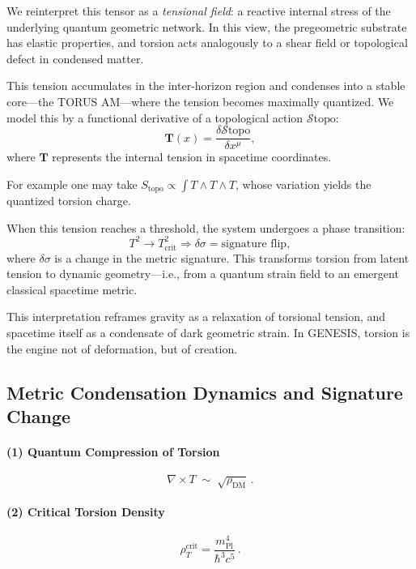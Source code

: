\documentclass{article}
\begin{document}
We reinterpret this tensor as a \textit{tensional field}: a reactive internal stress of the underlying quantum geometric network. In this view, the pregeometric substrate has elastic properties, and torsion acts analogously to a shear field or topological defect in condensed matter.

This tension accumulates in the inter-horizon region and condenses into a stable core---the TORUS AM---where the tension becomes maximally quantized. We model this by a functional derivative of a topological action $\mathcal{S}{\text{topo}}$: \begin{equation} \mathbf{T}(x) = \frac{\delta \mathcal{S}{\text{topo}}}{\delta x^\mu}, \end{equation} where $\mathbf{T}$ represents the internal tension in spacetime coordinates.

For example one may take
$S_{\text{topo}} \propto \int T \wedge T \wedge T$,
whose variation yields the quantized torsion charge.

When this tension reaches a threshold, the system undergoes a phase transition: \begin{equation} T^2 \rightarrow T_{\text{crit}}^2 \Rightarrow \delta \sigma = \text{signature flip}, \end{equation} where $\delta \sigma$ is a change in the metric signature. This transforms torsion from latent tension to dynamic geometry---i.e., from a quantum strain field to an emergent classical spacetime metric.

This interpretation reframes gravity as a relaxation of torsional tension, and spacetime itself as a condensate of dark geometric strain. In GENESIS, torsion is the engine not of deformation, but of creation.


\subsection{Metric Condensation Dynamics and Signature Change}

\paragraph{(1) Quantum Compression of Torsion}
\[
  \nabla\times T \;\sim\; \sqrt{\rho_{\mathrm{DM}}}\,.
\]
\paragraph{(2) Critical Torsion Density}
\[
  \rho_T^{\mathrm{crit}}
  = \frac{m_{\mathrm{Pl}}^4}{\hbar^3c^5}\,.
\]
\end{document}
